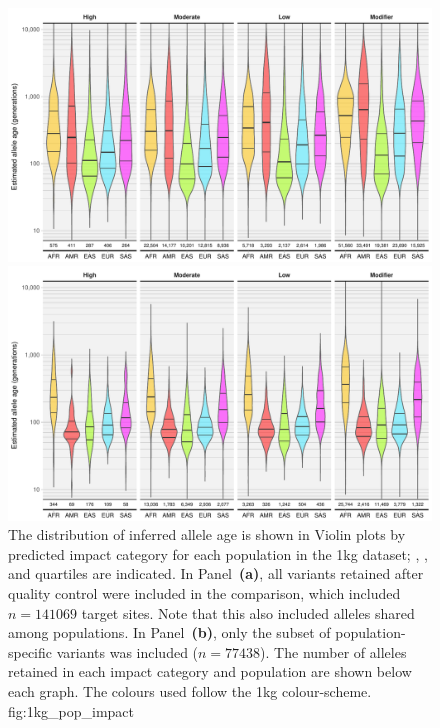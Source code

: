 

\begin{figure}[p]
{\footnotesize{}} \\
\includegraphics[width=\textwidth]{./img/ch5/1kg_pop_impact_a}
{\footnotesize{}} \\
\includegraphics[width=\textwidth]{./img/ch5/1kg_pop_impact_b}
%
{The distribution of inferred allele age is shown in Violin plots by predicted impact category for each population in the \gls{1kg} dataset; , , and  quartiles are indicated.
In Panel~\textbf{(a)}, all variants retained after quality control were included in the comparison, which included ${n = \num{141069}}$ target sites.
Note that this also included alleles shared among populations.
In Panel~\textbf{(b)}, only the subset of population-specific variants was included (${n = \num{77438}}$).
The number of alleles retained in each impact category and population are shown below each graph.
The colours used follow the \gls{1kg} colour-scheme.}%
{fig:1kg_pop_impact}
\end{figure}
